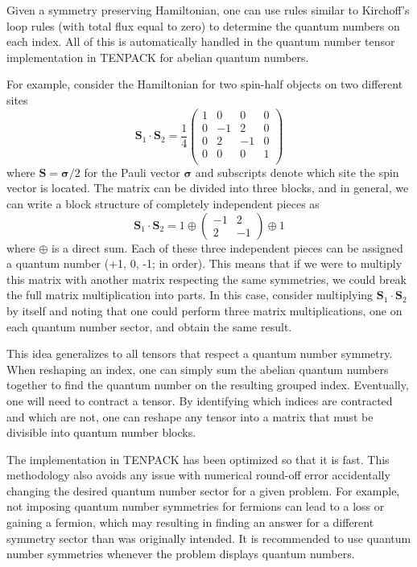 \documentclass{juliacon}
\begin{document}
\begin{appendix}
Given a symmetry preserving Hamiltonian, one can use rules similar to Kirchoff's loop rules (with total flux equal to zero) to determine the quantum numbers on each index. All of this is automatically handled in the quantum number tensor implementation in TENPACK for abelian quantum numbers. 

For example, consider the Hamiltonian for two spin-half objects on two different sites
\begin{equation}
\mathbf{S}_1\cdot\mathbf{S}_2=\frac14\left(\begin{array}{cccc}
1 & 0 & 0 & 0\\
0 & -1 & 2 & 0\\
0 & 2 & -1 & 0\\
0 & 0 & 0 & 1\\
\end{array}\right)
\end{equation}
where $\mathbf{S}=\boldsymbol{\sigma}/2$ for the Pauli vector $\boldsymbol{\sigma}$ \cite{townsend2000modern} and subscripts denote which site the spin vector is located. The matrix can be divided into three blocks, and in general, we can write a block structure of completely independent pieces as
\begin{equation}
\mathbf{S}_1\cdot\mathbf{S}_2=1\oplus\left(\begin{array}{cc}
-1 & 2 \\
2 & -1
\end{array}\right)\oplus1
\end{equation}
where $\oplus$ is a direct sum. Each of these three independent pieces can be assigned a quantum number (+1, 0, -1; in order). This means that if we were to multiply this matrix with another matrix respecting the same symmetries, we could break the full matrix multiplication into parts. In this case, consider multiplying $\mathbf{S}_1\cdot\mathbf{S}_2$ by itself and noting that one could perform three matrix multiplications, one on each quantum number sector, and obtain the same result.

This idea generalizes to all tensors that respect a quantum number symmetry. When reshaping an index, one can simply sum the abelian quantum numbers together to find the quantum number on the resulting grouped index. Eventually, one will need to contract a tensor. By identifying which indices are contracted and which are not, one can reshape any tensor into a matrix that must be divisible into quantum number blocks.

The implementation in TENPACK has been optimized so that it is fast. This methodology also avoids any issue with numerical round-off error accidentally changing the desired quantum number sector for a given problem. For example, not imposing quantum number symmetries for fermions can lead to a loss or gaining a fermion, which may resulting in finding an answer for a different symmetry sector than was originally intended. It is recommended to use quantum number symmetries whenever the problem displays quantum numbers.



\end{appendix}
\end{document}
